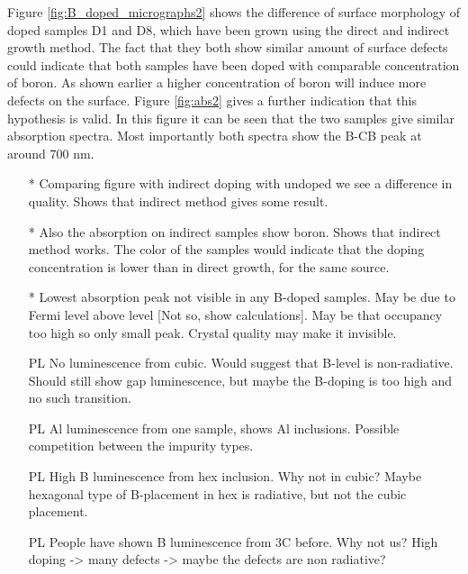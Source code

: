 Figure \ref{fig:B_doped_micrographs2} shows the difference of surface morphology of doped samples D1 and D8, which have been grown using the direct and indirect growth method. The fact that they both show similar amount of surface defects could indicate that both samples have been doped with comparable concentration of boron. As shown earlier a higher concentration of boron will induce more defects on the surface. Figure \ref{fig:abs2} gives a further indication that this hypothesis is valid. In this figure it can be seen that the two samples give similar absorption spectra. Most importantly both spectra show the B-CB peak at around 700 nm. 


\begin{itemize}
\item[*] Comparing figure with indirect doping with undoped we see a difference in quality. Shows that indirect method gives some result. 
\item[*] Also the absorption on indirect samples show boron. Shows that indirect method works. The color of the samples would indicate that the doping concentration is lower than in direct growth, for the same source. 
\item [*] Lowest absorption peak not visible in any B-doped samples. May be due to Fermi level above level [Not so, show calculations]. May be that occupancy too high so only small peak. Crystal quality may make it invisible. 
\item[PL] No luminescence from cubic. Would suggest that B-level is non-radiative. Should still show gap luminescence, but maybe the B-doping is too high and no such transition. 
\item[PL] Al luminescence from one sample, shows Al inclusions. Possible competition between the impurity types. 
\item[PL] High B luminescence from hex inclusion. Why not in cubic? Maybe hexagonal type of B-placement in hex is radiative, but not the cubic placement. 
\item[PL] People have shown B luminescence from 3C before. Why not us? High doping -> many defects -> maybe the defects are non radiative?
\end{itemize}












































